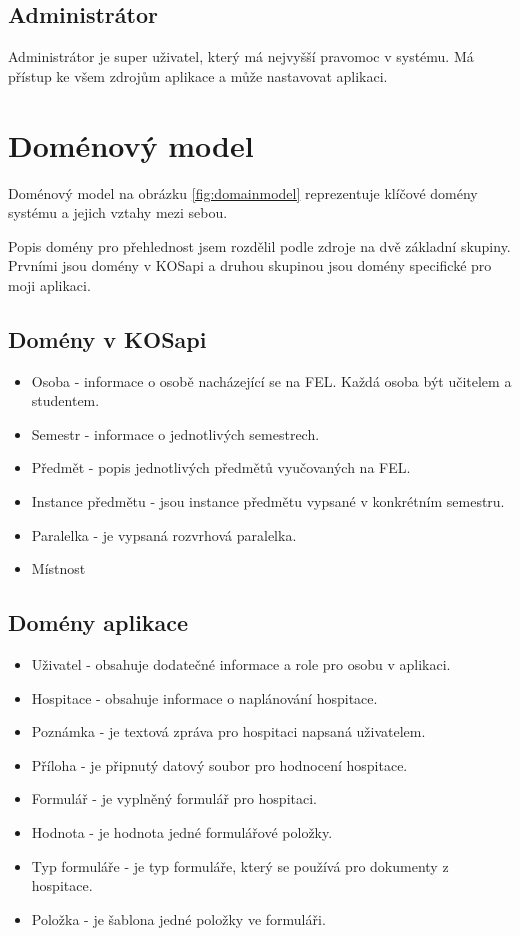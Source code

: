 \subsection{Administrátor}
Administrátor je super uživatel, který má nejvyšší pravomoc v systému. Má přístup ke všem zdrojům aplikace a může nastavovat aplikaci.

\section{Doménový model}
Doménový model na obrázku \ref{fig:domainmodel} reprezentuje klíčové domény systému a jejich vztahy mezi sebou. 

Popis domény pro přehlednost jsem rozdělil podle zdroje na dvě základní skupiny. Prvními jsou domény v KOSapi a druhou skupinou jsou domény specifické pro moji aplikaci. 

\subsection{Domény v KOSapi}
\begin{itemize}
\item Osoba - informace o osobě nacházející se na FEL. Každá osoba být učitelem a studentem.
\item Semestr - informace o jednotlivých semestrech. 
\item Předmět - popis jednotlivých předmětů vyučovaných na FEL.
\item Instance předmětu - jsou instance předmětu vypsané v konkrétním semestru.
\item Paralelka - je vypsaná rozvrhová paralelka.
\item Místnost
\end{itemize}

\subsection{Domény aplikace}
\begin{itemize}
\item Uživatel - obsahuje dodatečné informace a role pro osobu v aplikaci.
\item Hospitace - obsahuje informace o naplánování hospitace. 
\item Poznámka - je textová zpráva pro hospitaci napsaná uživatelem.
\item Příloha - je připnutý datový soubor pro hodnocení hospitace.
\item Formulář - je vyplněný formulář pro hospitaci.
\item Hodnota - je hodnota jedné formulářové položky.
\item Typ formuláře - je typ formuláře, který se používá pro dokumenty z hospitace. 
\item Položka - je šablona jedné položky ve formuláři.
\end{itemize}

